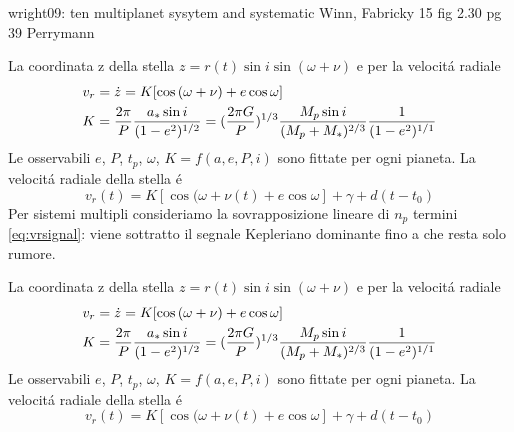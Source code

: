 \begin{workout}
wright09: ten multiplanet sysytem and systematic
Winn, Fabricky 15
fig 2.30 pg 39 Perrymann
\end{workout}


\begin{workout}
La coordinata z della stella $z=r(t)\sin{i}\sin{(\omega+\nu)}$ e per la velocit\'a radiale
\begin{align}
&v_r=\dot{z}=K[\cos{(\omega+\nu)}+e\cos{\omega}]\label{eq:vrsignal}\\
&K=\frac{2\pi}{P}\frac{a_*\sin{i}}{(1-e^2)^{1/2}}=(\frac{2\pi G}{P})^{1/3}\frac{M_p\sin{i}}{(M_p+M_*)^{2/3}}\frac{1}{(1-e^2)^{1/1}}
\end{align}
Le osservabili $e$, $P$, $t_p$, $\omega$, $K=f(a,e,P,i)$ sono fittate per ogni pianeta.
La velocit\'a radiale della stella \'e
\begin{equation}
v_r(t)=K[\cos{(\omega+\nu(t)}+e\cos{\omega}]+\gamma+d(t-t_0)
\end{equation}
Per sistemi multipli consideriamo la sovrapposizione lineare di $n_p$ termini \eqref{eq:vrsignal}: viene sottratto il segnale Kepleriano dominante fino a che resta solo rumore.
\end{workout}

\begin{workout}
La coordinata z della stella $z=r(t)\sin{i}\sin{(\omega+\nu)}$ e per la velocit\'a radiale
\begin{align}
&v_r=\dot{z}=K[\cos{(\omega+\nu)}+e\cos{\omega}]\label{eq:vrsignal}\\
&K=\frac{2\pi}{P}\frac{a_*\sin{i}}{(1-e^2)^{1/2}}=(\frac{2\pi G}{P})^{1/3}\frac{M_p\sin{i}}{(M_p+M_*)^{2/3}}\frac{1}{(1-e^2)^{1/1}}
\end{align}
Le osservabili $e$, $P$, $t_p$, $\omega$, $K=f(a,e,P,i)$ sono fittate per ogni pianeta.
La velocit\'a radiale della stella \'e
\begin{equation}
v_r(t)=K[\cos{(\omega+\nu(t)}+e\cos{\omega}]+\gamma+d(t-t_0)
\end{equation}
\end{workout}

